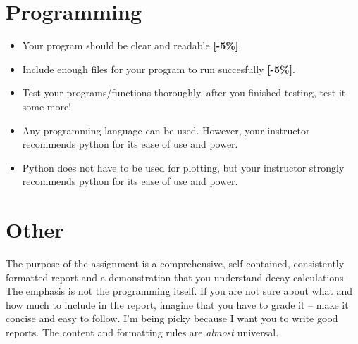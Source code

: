 \documentclass{article}
\begin{document}
        \section{Programming}

        \begin{itemize}
                \item Your program should be clear and readable {\color{red}\textbf{[-5\%]}}. 
                \item Include enough files for your program to run succesfully {\color{red}\textbf{[-5\%]}}. 
                \item Test your programs/functions thoroughly, after you finished testing, test 
it some more!
\item    Any programming language can be used. However, your instructor 
        recommends python for its ease of use and power.
\item   Python does not have to be used for plotting, but your instructor 
        strongly recommends python for its ease of use and power.
        \end{itemize}

        \section{Other}
  The purpose of the assignment is a comprehensive, self-contained, 
  consistently formatted report and a demonstration that you understand decay 
  calculations. The emphasis is not the programming itself.  If you are not 
  sure about what and how much to include in the report, imagine that you have 
  to grade it – make it concise and easy to follow. I’m being picky because I 
  want you to write good reports.  The content and formatting rules are 
  \emph{almost} universal.
\end{document}
